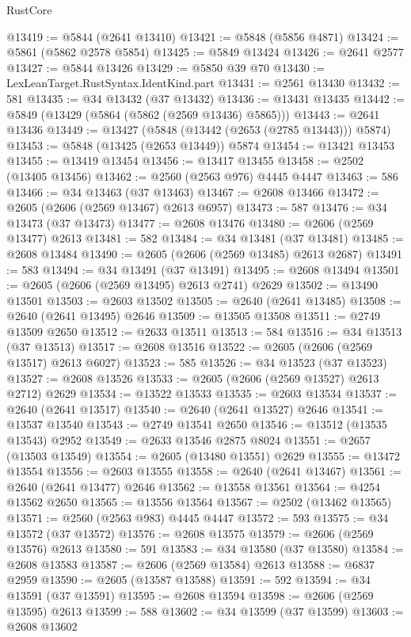 \begin{lexlean}{RustCore}
\begin{coremodule}
@13419 := @5844 (@2641 @13410)
@13421 := @5848 (@5856 @4871)
@13424 := @5861 (@5862 @2578 @5854)
@13425 := @5849 @13424
@13426 := @2641 @2577
@13427 := @5844 @13426
@13429 := @5850 @39 @70
@13430 := LexLeanTarget.RustSyntax.IdentKind.part
@13431 := @2561 @13430
@13432 := 581
@13435 := @34 @13432 (@37 @13432)
@13436 := @13431 @13435
@13442 := @5849 (@13429 (@5864 (@5862 (@2569 @13436) @5865)))
@13443 := @2641 @13436
@13449 := @13427 (@5848 (@13442 (@2653 (@2785 @13443))) @5874)
@13453 := @5848 (@13425 (@2653 @13449)) @5874
@13454 := @13421 @13453
@13455 := @13419 @13454
@13456 := @13417 @13455
@13458 := @2502 (@13405 @13456)
@13462 := @2560 (@2563 @976) @4445 @4447
@13463 := 586
@13466 := @34 @13463 (@37 @13463)
@13467 := @2608 @13466
@13472 := @2605 (@2606 (@2569 @13467) @2613 @6957)
@13473 := 587
@13476 := @34 @13473 (@37 @13473)
@13477 := @2608 @13476
@13480 := @2606 (@2569 @13477) @2613
@13481 := 582
@13484 := @34 @13481 (@37 @13481)
@13485 := @2608 @13484
@13490 := @2605 (@2606 (@2569 @13485) @2613 @2687)
@13491 := 583
@13494 := @34 @13491 (@37 @13491)
@13495 := @2608 @13494
@13501 := @2605 (@2606 (@2569 @13495) @2613 @2741) @2629
@13502 := @13490 @13501
@13503 := @2603 @13502
@13505 := @2640 (@2641 @13485)
@13508 := @2640 (@2641 @13495) @2646
@13509 := @13505 @13508
@13511 := @2749 @13509 @2650
@13512 := @2633 @13511
@13513 := 584
@13516 := @34 @13513 (@37 @13513)
@13517 := @2608 @13516
@13522 := @2605 (@2606 (@2569 @13517) @2613 @6027)
@13523 := 585
@13526 := @34 @13523 (@37 @13523)
@13527 := @2608 @13526
@13533 := @2605 (@2606 (@2569 @13527) @2613 @2712) @2629
@13534 := @13522 @13533
@13535 := @2603 @13534
@13537 := @2640 (@2641 @13517)
@13540 := @2640 (@2641 @13527) @2646
@13541 := @13537 @13540
@13543 := @2749 @13541 @2650
@13546 := @13512 (@13535 @13543) @2952
@13549 := @2633 @13546 @2875 @8024
@13551 := @2657 (@13503 @13549)
@13554 := @2605 (@13480 @13551) @2629
@13555 := @13472 @13554
@13556 := @2603 @13555
@13558 := @2640 (@2641 @13467)
@13561 := @2640 (@2641 @13477) @2646
@13562 := @13558 @13561
@13564 := @4254 @13562 @2650
@13565 := @13556 @13564
@13567 := @2502 (@13462 @13565)
@13571 := @2560 (@2563 @983) @4445 @4447
@13572 := 593
@13575 := @34 @13572 (@37 @13572)
@13576 := @2608 @13575
@13579 := @2606 (@2569 @13576) @2613
@13580 := 591
@13583 := @34 @13580 (@37 @13580)
@13584 := @2608 @13583
@13587 := @2606 (@2569 @13584) @2613
@13588 := @6837 @2959
@13590 := @2605 (@13587 @13588)
@13591 := 592
@13594 := @34 @13591 (@37 @13591)
@13595 := @2608 @13594
@13598 := @2606 (@2569 @13595) @2613
@13599 := 588
@13602 := @34 @13599 (@37 @13599)
@13603 := @2608 @13602

\end{coremodule}
\end{lexlean}
